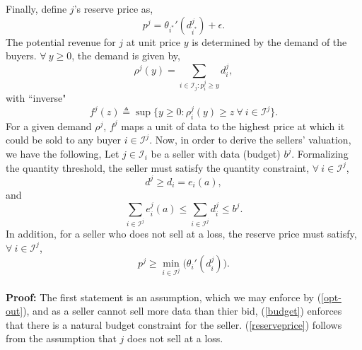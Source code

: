 \documentclass[12pt]{article}
\theoremstyle{definition}
\newcommand{\mcI}{\mathcal{I}}
\begin{document}
\begin{multicols}{2}
Finally, define $j$'s reserve price as, 
\begin{equation}\label{newprice}
    p^j = \theta_{i^*}'(d_{i^*}^j) + \epsilon.
\end{equation}
The potential revenue for $j$ at unit price $y$ is determined by the
demand of the buyers. $\forall \ y\ge 0$, the demand is given by,
\begin{equation}\label{datademand}
    \rho^j(y) = \sum_{i\in\mcI_j : p_i^j\ge y} d_i^j, 
\end{equation}
with ``inverse"
\begin{equation}\label{revenue}
    f^j(z) \triangleq \sup\big\lbrace y\ge 0:
        \rho_i^j(y) \ge z \ \forall \ i \in \mcI^j\big\rbrace.
\end{equation}
For a given demand $\rho^j$, $f^j$ maps a unit of data to the highest price at
which it could be sold to any buyer $i\in \mcI^j$.
Now, in order to derive the sellers' valuation, we have the following,
{
\label{constraints}
Let $j\in\mcI_i$ be a seller with data (budget) $b^j$.
Formalizing the quantity threshold, the seller must satisfy the quantity
constraint, $\forall \ i \in\mcI^j$,
\begin{equation}\label{quantity}
    d^j \ge d_i = e_i(a),
\end{equation}
and
\begin{equation}\label{budget}
    \displaystyle\sum_{i\in\mcI^j} e_i^j(a) \le \sum_{i\in\mcI^j} d^j_i \le b^j.
\end{equation}
In addition, for a seller who does not sell at a loss, the reserve price must
satisfy, $\forall \ i \in \mcI^j$,
\begin{equation}\label{reserveprice}
   p^j \ge \min_{i\in\mcI^j}\big({\theta_i}'(d_i^j)\big).
\end{equation}
}\\
\textbf{Proof:}
The first statement is an assumption, which we may enforce by (\ref{opt-out}),
and as a seller cannot sell more data than thier bid, (\ref{budget}) enforces
that there is a natural budget constraint for the seller. (\ref{reserveprice})
follows from the assumption that $j$ does not sell at a loss.


\end{multicols}
\end{document}
